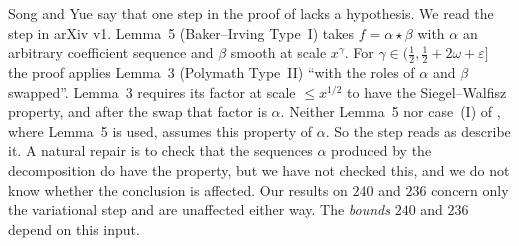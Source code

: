 \begin{remark}\label{rem:sta-lemma5}
Song and Yue \cite[Remark~4.23]{SY26} say that one step in the proof of
\cite[Lemma~5]{Sta26} lacks a hypothesis. We read the step in arXiv v1. Lemma~5
(Baker--Irving Type~I) takes $f=\alpha\star\beta$ with $\alpha$ an arbitrary
coefficient sequence and $\beta$ smooth at scale $x^\gamma$. For
$\gamma\in(\frac12,\frac12+2\omega+\varepsilon]$ the proof applies Lemma~3
(Polymath Type~II) ``with the roles of $\alpha$ and $\beta$ swapped''. Lemma~3
requires its factor at scale $\le x^{1/2}$ to have the Siegel--Walfisz
property, and after the swap that factor is $\alpha$. Neither Lemma~5 nor
case~(I) of \cite[Definition~9]{Sta26}, where Lemma~5 is used, assumes this
property of $\alpha$. So the step reads as \cite{SY26} describe it. A
natural repair is to check that the sequences $\alpha$ produced by the
decomposition do have the property, but we have not checked this, and we do
not know whether the conclusion is affected. Our results on $240$ and $236$
concern only the variational step and are unaffected either way. The
\emph{bounds} $240$ and $236$ depend on this input.
\end{remark}

